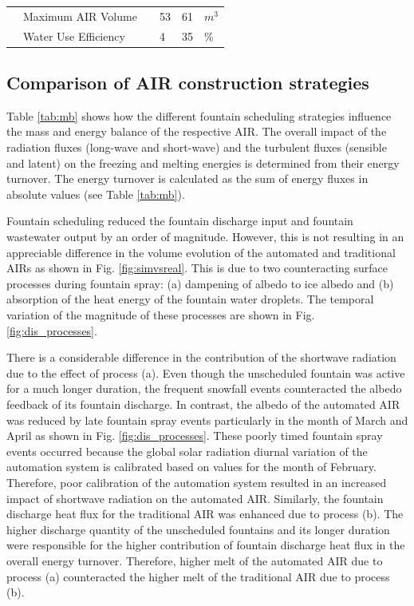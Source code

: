 \documentclass[tc, manuscript]{copernicus}
\begin{document}
\begin{table}
\begin{tabular}{@{}|llllll|@{}}
		                       & Maximum AIR Volume              &                 & 53            & 61            & $m^{3}$ \\
		\multicolumn{1}{|l|}{} & Water Use Efficiency            &                 & 4             & 35            & \% \\\midrule
	\end{tabular}
\end{table}

\subsection{Comparison of AIR construction strategies}

Table \ref{tab:mb} shows how the different fountain scheduling strategies influence the mass and energy balance
of the respective AIR.  The overall impact of the radiation fluxes (long-wave and short-wave) and the
turbulent fluxes (sensible and latent) on the freezing and melting energies is determined from their 
energy turnover. The energy turnover is calculated as the sum of energy fluxes in absolute values (see Table
\ref{tab:mb}). 

Fountain scheduling reduced the fountain discharge input and fountain wastewater output by an order of
magnitude. However, this is not resulting in an appreciable difference in the volume evolution of the automated
and traditional AIRs as shown in Fig. \ref{fig:simvsreal}. This is due to two counteracting surface processes
during fountain spray: (a) dampening of albedo to ice albedo and (b) absorption of the heat energy of
the fountain water droplets. The temporal variation of the magnitude of these processes are shown in Fig.
\ref{fig:dis_processes}.

There is a considerable difference in the contribution of the shortwave radiation due to the effect of process
(a). Even though the unscheduled fountain was active for a much longer duration, the frequent snowfall events
counteracted the albedo feedback of its fountain discharge. In contrast, the albedo of the automated AIR was
reduced by late fountain spray events particularly in the month of March and April as shown in Fig.
\ref{fig:dis_processes}. These poorly timed fountain spray events occurred because the global solar radiation
diurnal variation of the automation system is calibrated based on values for the month of February. Therefore,
poor calibration of the automation system resulted in an increased impact of shortwave radiation on the
automated AIR. Similarly, the fountain discharge heat flux for the traditional AIR was enhanced due to process
(b). The higher discharge quantity of the unscheduled fountains and its longer duration were responsible for the
higher contribution of fountain discharge heat flux in the overall energy turnover. Therefore, higher melt of
the automated AIR due to process (a) counteracted the higher melt of the traditional AIR due to process (b).
\end{document}
